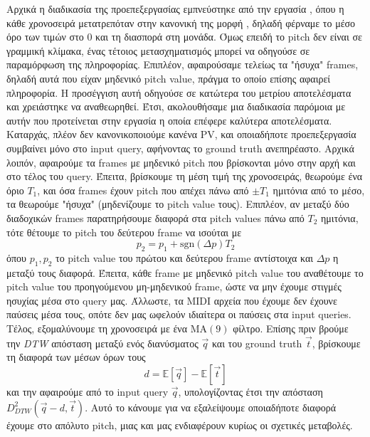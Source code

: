 Αρχικά η διαδικασία της προεπεξεργασίας εμπνεύστηκε από την εργασία \cite{Zhu:2003:WIE:872757.872780}, όπου η κάθε χρονοσειρά μετατρεπόταν
στην κανονική της μορφή \cite{goldin1995similarity}, δηλαδή φέρναμε το μέσο όρο των τιμών στο 0 και τη διασπορά στη μονάδα. Όμως επειδή το
pitch δεν είναι σε γραμμική κλίμακα, ένας τέτοιος μετασχηματισμός μπορεί να οδηγούσε σε παραμόρφωση της πληροφορίας. Επιπλέον, αφαιρούσαμε
τελείως τα "ήσυχα" frames, δηλαδή αυτά που είχαν μηδενικό pitch value, πράγμα το οποίο επίσης αφαιρεί πληροφορία. Η προσέγγιση αυτή
οδηγούσε σε κατώτερα του μετρίου αποτελέσματα και χρειάστηκε να αναθεωρηθεί. Έτσι, ακολουθήσαμε μια διαδικασία παρόμοια με αυτήν που
προτείνεται στην εργασία \cite{stasiak2014follow} η οποία επέφερε καλύτερα αποτελέσματα. Καταρχάς, πλέον δεν κανονικοποιούμε κανένα PV,
και οποιαδήποτε προεπεξεργασία συμβαίνει μόνο στο input query, αφήνοντας το ground truth ανεπηρέαστο. Αρχικά λοιπόν, αφαιρούμε τα frames
με μηδενικό pitch που βρίσκονται μόνο στην αρχή και στο τέλος του query. Έπειτα, βρίσκουμε τη μέση τιμή της χρονοσειράς, θεωρούμε ένα όριο
$T_1$, και όσα frames έχουν pitch που απέχει πάνω από $\pm T_1$ ημιτόνια από το μέσο, τα θεωρούμε "ήσυχα" (μηδενίζουμε το pitch value
τους). Επιπλέον, αν μεταξύ δύο διαδοχικών frames παρατηρήσουμε διαφορά στα pitch values πάνω από $T_2$ ημιτόνια, τότε θέτουμε το pitch του
δεύτερου frame να ισούται με
$$p_2 = p_1 + \mathrm{sgn}(\Delta p) T_2$$
όπου $p_1, p_2$ το pitch value του πρώτου και δεύτερου frame αντίστοιχα και $\Delta p$ η μεταξύ τους διαφορά. Έπειτα, κάθε frame με
μηδενικό pitch value του αναθέτουμε το pitch value του προηγούμενου μη-μηδενικού frame, ώστε να μην έχουμε στιγμές ησυχίας μέσα στο query
μας. Άλλωστε, τα MIDI αρχεία που έχουμε δεν έχουνε παύσεις μέσα τους, οπότε δεν μας ωφελούν ιδιαίτερα οι παύσεις στα input queries.
Τέλος, εξομαλύνουμε τη χρονοσειρά με ένα $\mathrm{MA}(9)$ φίλτρο. Επίσης πριν βρούμε την \emph{DTW} απόσταση μεταξύ ενός διανύσματος
$\vec{q}$ και του ground truth $\vec{t}$, βρίσκουμε τη διαφορά των μέσων όρων τους
$$d = \mathbb{E}[\vec{q}] - \mathbb{E}[\vec{t}]$$
και την αφαιρούμε από το input query $\vec{q}$, υπολογίζοντας έτσι την απόσταση $D^2_{DTW}(\vec{q} - d, \vec{t})$. Αυτό το
κάνουμε για να εξαλείψουμε οποιαδήποτε διαφορά έχουμε στο απόλυτο pitch, μιας και μας ενδιαφέρουν κυρίως οι σχετικές μεταβολές.


